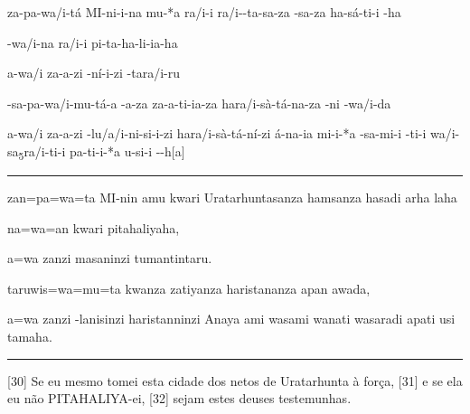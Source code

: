 \setcounter{parcount}{29}
\begin{parnumbersa}[]

	\raggedright%
	\itshape%


	\lmasc{}za-pa-wa/i-tá \lmasc{}MI-ni-i-na mu-*a
	\lmasc{}ra/i-i \spac{}ra/i--ta-sa-za
	\lmasc{}-sa-za \lmasc{}ha-sá-ti-i  \lmasc{}-ha

	\lmasc{}-wa/i-na \lmasc{}ra/i-i pi-ta-ha-li-ia-ha

	a-wa/i \lmasc{}za-a-zi \lmasc{}-ní-i-zi \lmasc{}-ta\logo{+}ra/i-ru

	-sa-pa\lbreak{}-wa/i-mu-tá-a \lmasc{}-a-za za-a-ti-ia-za \lmasc{}ha\logo{+}ra/i-sà-tá-na-za -ni \lmasc{}-wa/i-da

	a-wa/i \lmasc{}za-a-zi -lu/a/i-ni-si-i-zi
	ha\logo{+}ra/i-sà-tá-ní-zi \spac{}á-na-ia mi-i-*a
	\lmasc{}-sa-mi-i -ti-i
	\lmasc{}wa/i-sa\textsubscript{5}\logo{+}ra/i-ti-i pa-ti-i-*a \lmasc{}u-si-i --h$[$a$]$


\end{parnumbersa}

\vspace{10pt}
\hrule
\vspace{10pt}


\setcounter{parcount}{29}
\begin{parnumbersa}[]

	\raggedright%
	\itshape%


	zan=pa=wa=ta MI-nin amu kwari Uratarhuntasanza hamsanza hasadi arha laha

	na=wa=an kwari pitahaliyaha,

	a=wa zanzi masaninzi tumantintaru.

	taruwis=wa=mu=ta kwanza zatiyanza haristananza apan awada,

	a=wa zanzi -lanisinzi haristanninzi Anaya ami wasami wanati wasaradi
	apati usi tamaha.


\end{parnumbersa}

\vspace{10pt}
\hrule
\vspace{10pt}


[30] Se eu mesmo tomei esta cidade dos netos de Uratarhunta à força,
[31] e se ela eu não PITAHALIYA-ei,
[32] sejam estes deuses testemunhas.


